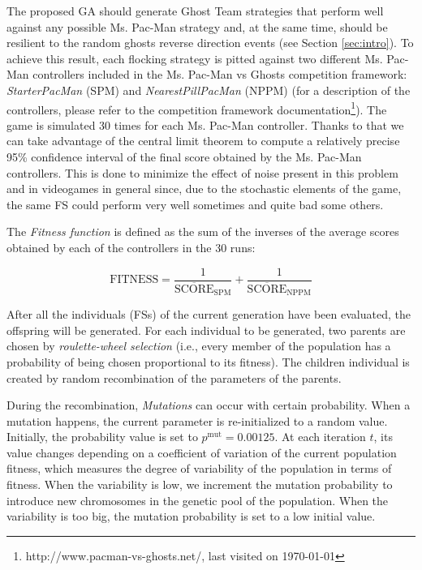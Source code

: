 \documentclass[a4paper]{llncs}
\begin{document}
The proposed GA should generate Ghost Team strategies that perform well against any possible Ms. Pac-Man strategy and, at the same time, should be resilient to the random ghosts reverse direction events (see Section \ref{sec:intro}). To achieve this result, each flocking strategy is pitted against two different Ms. Pac-Man controllers included in the Ms. Pac-Man vs Ghosts competition framework: \textit{StarterPacMan} (SPM) and \textit{NearestPillPacMan} (NPPM) (for a description of the controllers, please refer to the competition framework documentation\footnote{http://www.pacman-vs-ghosts.net/, last visited on {\today}}). The game is simulated 30 times for each Ms. Pac-Man
controller. Thanks to that we can take advantage of the central limit
theorem to compute a relatively precise 95\% confidence interval of
the final score obtained by the Ms. Pac-Man controllers. This is done to minimize the effect of noise present in this problem and in videogames in general \cite{Mora12} since, due to the stochastic elements of the game, the same FS could perform very well sometimes and quite bad some others. 

The \textit{Fitness function} is defined as the sum of the inverses of the average scores obtained by each of the controllers in the 30 runs:

\begin{small}
\begin{equation}
\mathrm{FITNESS} = \frac{1}{\overline{\mathrm{SCORE}}_\mathrm{SPM}} + \frac{1}{\overline{\mathrm{SCORE}}_\mathrm{NPPM}}
\end{equation}
\end{small}

After all the individuals (FSs) of the current generation have been evaluated, the offspring will be generated. For each individual to be generated, two parents are chosen by \textit{roulette-wheel selection}  (i.e., every member of the population has a probability of being chosen proportional to its fitness). The children individual is created by random recombination of the parameters of the parents.

During the recombination, \textit{Mutations} can occur with certain probability. When a mutation happens, the current parameter is re-initialized to a random value. Initially, the probability value is set to $p^\mathrm{mut} =
0.00125$. At each iteration $t$, its value changes depending on a coefficient of variation of the current population fitness, which measures the degree of variability of the population in terms of fitness. When the variability is low, we increment the mutation probability to introduce new chromosomes in the genetic pool of the population. When the variability is too big, the mutation probability is set to a low initial value.
\end{document}
